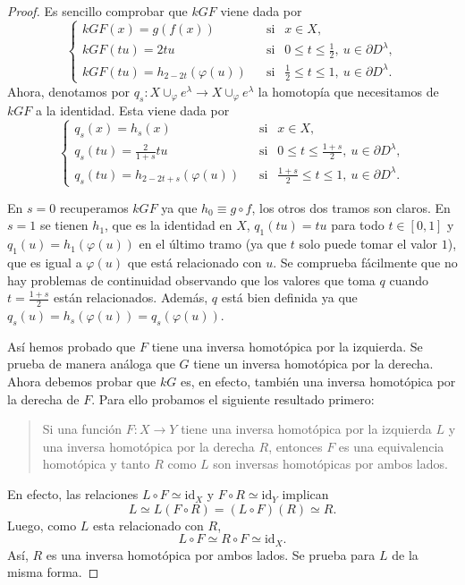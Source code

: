 \begin{proof}
    Es sencillo comprobar que $kGF$ viene dada por
    \begin{equation*}
        \begin{cases}
            kGF(x) = g(f(x)) &~~\text{ si }~~ x\in X,\\
            kGF(tu) = 2tu &~~\text{ si }~~ 0\le t\le \frac{1}{2},~u\in \partial D^{\lambda},\\
            kGF(tu) = h_{2-2t}(\varphi(u)) &~~\text{ si }~~ \frac{1}{2}\le t\le 1,~u\in \partial D^{\lambda}.
        \end{cases}
    \end{equation*} 
    Ahora, denotamos por $q_s:X\cup_{\varphi} e^{\lambda}\to X\cup_{\varphi} e^{\lambda}$ la homotopía que necesitamos de $kGF$ a la identidad. Esta viene dada por
    \begin{equation*}
        \begin{cases}
            q_s(x) = h_s(x) &~~\text{ si }~~ x\in X,\\
            q_s(tu) = \frac{2}{1+s}tu &~~\text{ si }~~ 0\le t\le \frac{1+s}{2},~u\in \partial D^{\lambda},\\
            q_s(tu) = h_{2-2t+s}(\varphi(u)) &~~\text{ si }~~ \frac{1+s}{2}\le t\le 1,~u\in \partial D^{\lambda}.
        \end{cases}
    \end{equation*}

    En $s=0$ recuperamos $kGF$ ya que $h_0\equiv g\circ f$, los otros dos tramos son claros. En $s=1$ se tienen $h_1$, que es la identidad en $X$,  $q_1(tu)=tu$ para todo $t\in[0,1]$ y $q_1(u)=h_1(\varphi(u))$ en el último tramo (ya que $t$ solo puede tomar el valor $1$), que es igual a $\varphi(u)$ que está relacionado con $u$. Se comprueba fácilmente que no hay problemas de continuidad observando que los valores que toma $q$ cuando $t=\frac{1+s}{2}$ están relacionados. Además, $q$ está bien definida ya que $q_s(u) = h_s(\varphi(u)) = q_s(\varphi(u))$.

    Así hemos probado que $F$ tiene una inversa homotópica por la izquierda. Se prueba de manera análoga que $G$ tiene un inversa homotópica por la derecha. Ahora debemos probar que $kG$ es, en efecto, también una inversa homotópica por la derecha de $F$. Para ello probamos el siguiente resultado primero:
    \begin{quote}
        Si una función $F:X\to Y$ tiene una inversa homotópica por la izquierda $L$ y una inversa homotópica por la derecha $R$, entonces $F$ es una equivalencia homotópica y tanto $R$ como $L$ son inversas homotópicas por ambos lados.
    \end{quote}
    \medskip
    En efecto, las relaciones $L\circ F \simeq \text{id}_{X}$ y $F\circ R \simeq \text{id}_{Y}$ implican  
    \begin{equation*}
        L \simeq L(F\circ R) = (L\circ F)(R) \simeq R.
    \end{equation*}
    Luego, como $L$ esta relacionado con $R$,
    \begin{equation*}
        L\circ F \simeq R\circ F \simeq \text{id}_{X}.
    \end{equation*}
    Así, $R$ es una inversa homotópica por ambos lados. Se prueba para $L$ de la misma forma.


\end{proof}
